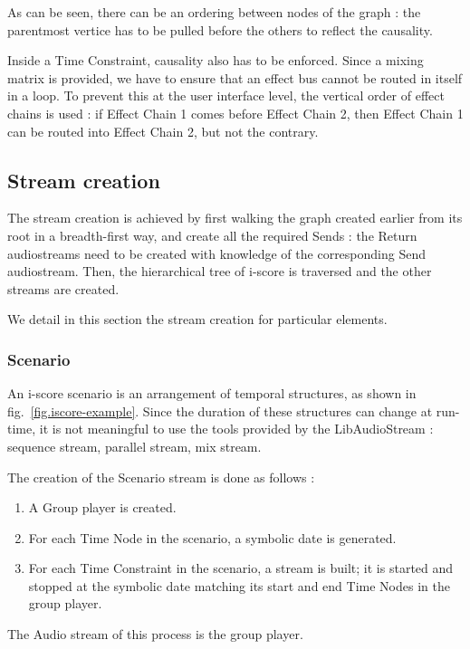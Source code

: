 \documentclass{article}
\begin{document}
As can be seen, there can be an ordering between nodes of the graph : the parentmost vertice
has to be pulled before the others to reflect the causality.

Inside a Time Constraint, causality also has to be enforced. 
Since a mixing matrix is provided, we have to ensure that an effect bus cannot be routed in 
itself in a loop. 
To prevent this at the user interface level, the vertical order of effect chains is used : 
if Effect Chain 1 comes before Effect Chain 2, then Effect Chain 1 can be routed into Effect Chain 2, but not the contrary.

\subsection{Stream creation}
The stream creation is achieved by first walking the graph
created earlier from its root in a breadth-first way, and create all the required Sends : the Return audiostreams need to be created with knowledge of the corresponding Send audiostream.
Then, the hierarchical tree of i-score is traversed and the other streams are created.

We detail in this section the stream creation for particular elements.
\subsubsection{Scenario}
An i-score scenario is an arrangement of temporal structures, as shown in fig.~\ref{fig.iscore-example}.
Since the duration of these structures can change at run-time, it is not meaningful to use the tools provided by the LibAudioStream : sequence stream, parallel stream, mix stream.

The creation of the Scenario stream is done as follows : 
\begin{enumerate}
	\item A Group player is created.
	\item For each Time Node in the scenario, a symbolic date is generated.
	\item For each Time Constraint in the scenario, a stream is built; it is started and stopped at the symbolic date matching its start and end Time Nodes in the group player.
\end{enumerate}

The Audio stream of this process is the group player.
\end{document}
